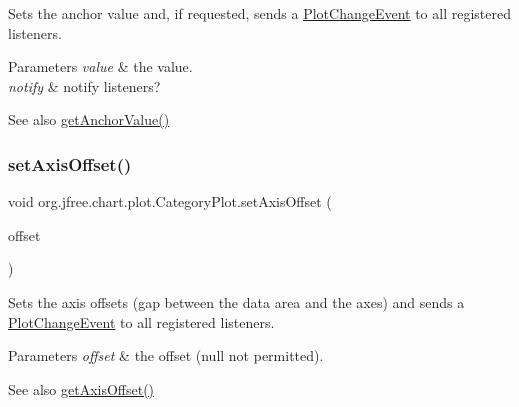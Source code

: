 Sets the anchor value and, if requested, sends a \mbox{\hyperlink{}{Plot\+Change\+Event}} to all registered listeners.


\begin{DoxyParams}{Parameters}
{\em value} & the value. \\
\hline
{\em notify} & notify listeners?\\
\hline
\end{DoxyParams}
\begin{DoxySeeAlso}{See also}
\mbox{\hyperlink{classorg_1_1jfree_1_1chart_1_1plot_1_1_category_plot_a7436b0bcbd290c89709539ad0e7c91be}{get\+Anchor\+Value()}} 
\end{DoxySeeAlso}
\mbox{\label{classorg_1_1jfree_1_1chart_1_1plot_1_1_category_plot_a2300f6317ee73cef6e46a90680af8d5a}} 
\subsubsection{\texorpdfstring{set\+Axis\+Offset()}{setAxisOffset()}}
{\footnotesize\ttfamily void org.\+jfree.\+chart.\+plot.\+Category\+Plot.\+set\+Axis\+Offset (\begin{DoxyParamCaption}\item[{Rectangle\+Insets}]{offset }\end{DoxyParamCaption})}

Sets the axis offsets (gap between the data area and the axes) and sends a \mbox{\hyperlink{}{Plot\+Change\+Event}} to all registered listeners.


\begin{DoxyParams}{Parameters}
{\em offset} & the offset ({\ttfamily null} not permitted).\\
\hline
\end{DoxyParams}
\begin{DoxySeeAlso}{See also}
\mbox{\hyperlink{classorg_1_1jfree_1_1chart_1_1plot_1_1_category_plot_ad556bbd20fb3657e4ca0f9a58b2cc105}{get\+Axis\+Offset()}} 
\end{DoxySeeAlso}
\mbox{\label{classorg_1_1jfree_1_1chart_1_1plot_1_1_category_plot_a2c7648bb5408634ddf9af63510c52773}} 
